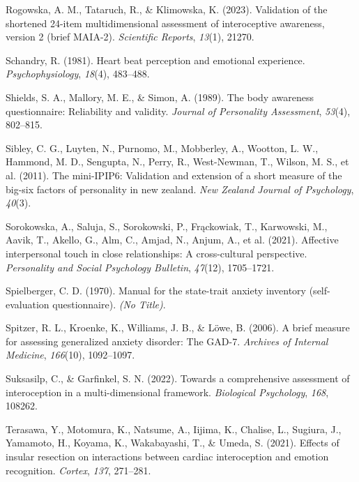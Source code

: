\documentclass[
  jou,
  floatsintext,
  longtable,
  nolmodern,
  notxfonts,
  notimes,
  colorlinks=true,linkcolor=blue,citecolor=blue,urlcolor=blue]{apa7}
\newlength{\cslhangindent}
\newenvironment{CSLReferences}[2] %
 {\begin{list}{}{%
  \setlength{\itemindent}{0pt}
  \setlength{\leftmargin}{0pt}
  \setlength{\parsep}{0pt}
  \ifodd #1
   \setlength{\leftmargin}{\cslhangindent}
   \setlength{\itemindent}{-1\cslhangindent}
  \fi
  \setlength{\itemsep}{#2\baselineskip}}}
 {\end{list}}
\begin{document}
\begin{CSLReferences}{1}{0}
Rogowska, A. M., Tataruch, R., \& Klimowska, K. (2023). Validation of
the shortened 24-item multidimensional assessment of interoceptive
awareness, version 2 (brief MAIA-2). \emph{Scientific Reports},
\emph{13}(1), 21270.

Schandry, R. (1981). Heart beat perception and emotional experience.
\emph{Psychophysiology}, \emph{18}(4), 483--488.

Shields, S. A., Mallory, M. E., \& Simon, A. (1989). The body awareness
questionnaire: Reliability and validity. \emph{Journal of Personality
Assessment}, \emph{53}(4), 802--815.

Sibley, C. G., Luyten, N., Purnomo, M., Mobberley, A., Wootton, L. W.,
Hammond, M. D., Sengupta, N., Perry, R., West-Newman, T., Wilson, M. S.,
et al. (2011). The mini-IPIP6: Validation and extension of a short
measure of the big-six factors of personality in new zealand. \emph{New
Zealand Journal of Psychology}, \emph{40}(3).

Sorokowska, A., Saluja, S., Sorokowski, P., Frąckowiak, T., Karwowski,
M., Aavik, T., Akello, G., Alm, C., Amjad, N., Anjum, A., et al. (2021).
Affective interpersonal touch in close relationships: A cross-cultural
perspective. \emph{Personality and Social Psychology Bulletin},
\emph{47}(12), 1705--1721.

Spielberger, C. D. (1970). Manual for the state-trait anxiety inventory
(self-evaluation questionnaire). \emph{(No Title)}.

Spitzer, R. L., Kroenke, K., Williams, J. B., \& Löwe, B. (2006). A
brief measure for assessing generalized anxiety disorder: The GAD-7.
\emph{Archives of Internal Medicine}, \emph{166}(10), 1092--1097.

Suksasilp, C., \& Garfinkel, S. N. (2022). Towards a comprehensive
assessment of interoception in a multi-dimensional framework.
\emph{Biological Psychology}, \emph{168}, 108262.

Terasawa, Y., Motomura, K., Natsume, A., Iijima, K., Chalise, L.,
Sugiura, J., Yamamoto, H., Koyama, K., Wakabayashi, T., \& Umeda, S.
(2021). Effects of insular resection on interactions between cardiac
interoception and emotion recognition. \emph{Cortex}, \emph{137},
271--281.


\end{CSLReferences}
\end{document}
